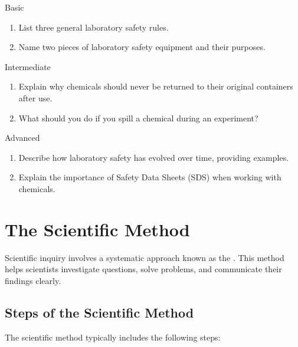 \begin{tieredquestions}{Basic}
\begin{enumerate}
    \item List three general laboratory safety rules.
    \item Name two pieces of laboratory safety equipment and their purposes.
\end{enumerate}
\end{tieredquestions}

\begin{tieredquestions}{Intermediate}
\begin{enumerate}
    \item Explain why chemicals should never be returned to their original containers after use.
    \item What should you do if you spill a chemical during an experiment?
\end{enumerate}
\end{tieredquestions}

\begin{tieredquestions}{Advanced}
\begin{enumerate}
    \item Describe how laboratory safety has evolved over time, providing examples.
    \item Explain the importance of Safety Data Sheets (SDS) when working with chemicals.
\end{enumerate}
\end{tieredquestions}

\section{The Scientific Method}

Scientific inquiry involves a systematic approach known as the . This method helps scientists investigate questions, solve problems, and communicate their findings clearly.

\subsection{Steps of the Scientific Method}

The scientific method typically includes the following steps:

